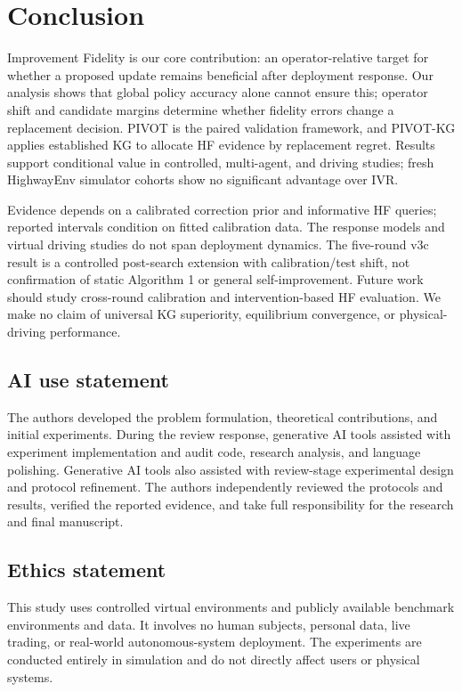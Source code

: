 \documentclass{article}
\begin{document}
\FloatBarrier
\section{Conclusion}

Improvement Fidelity is our core contribution: an operator-relative target for
whether a proposed update remains beneficial after deployment response. Our
analysis shows that global policy accuracy alone cannot ensure this; operator
shift and candidate margins determine whether fidelity errors change a
replacement decision. PIVOT is the paired validation framework, and PIVOT-KG
applies established KG to allocate HF evidence by replacement regret. Results
support conditional value in controlled, multi-agent, and driving studies;
fresh HighwayEnv simulator cohorts show no significant advantage over IVR.

Evidence depends on a calibrated correction prior and informative HF queries;
reported intervals condition on fitted calibration data. The response models
and virtual driving studies do not span deployment dynamics. The five-round
v3c result is a controlled post-search extension with calibration/test shift,
not confirmation of static Algorithm 1 or general self-improvement. Future
work should study cross-round calibration and intervention-based HF evaluation.
We make no claim of universal KG superiority, equilibrium convergence, or
physical-driving performance.

\label{sec:conclusion-end}


\subsection*{AI use statement}
The authors developed the problem formulation, theoretical contributions, and
initial experiments. During the review response, generative AI tools assisted
with experiment implementation and audit code, research analysis, and language
polishing. Generative AI tools also assisted with review-stage experimental
design and protocol refinement. The authors independently reviewed the
protocols and results,
verified the reported evidence, and take full responsibility for the research
and final manuscript.

\subsection*{Ethics statement}
This study uses controlled virtual environments and publicly available
benchmark environments and data. It involves no human subjects, personal data,
live trading, or real-world autonomous-system deployment. The experiments are
conducted entirely in simulation and do not directly affect users or physical
systems.
\end{document}

